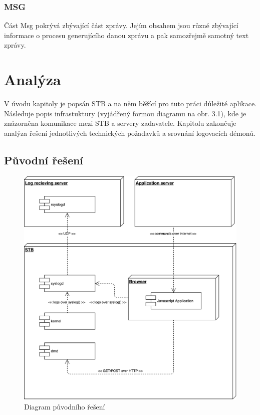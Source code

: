 \documentclass[thesis=B,czech]{FITthesis}[2012/06/26]
\begin{document}
\subsection{MSG}
Část Msg pokrývá zbývající část zprávy. Jejím obsahem jsou různé zbývající informace o procesu generujícího danou zprávu a pak samozřejmě samotný text zprávy.

\chapter{Analýza}
V úvodu kapitoly je popsán STB a na něm běžící pro tuto práci důležité aplikace.
Následuje popis infrastuktury (vyjádřený formou diagramu na obr. 3.1), kde je znázorněna komunikace mezi STB a servery zadavatele.
Kapitolu zakončuje analýza řešení jednotlivých technických požadavků a srovnání logovacích démonů.

\section{Původní řešení}
\begin{figure}[ht]
	\centering
	\includegraphics[scale=0.5]{images/diagram-puvodniho-reseni}
	\caption[Diagram původního řešení]{Diagram původního řešení}
\end{figure}
\end{document}
